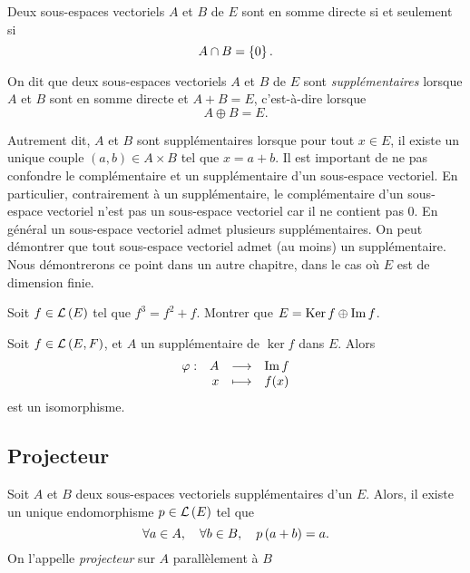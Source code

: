 \documentclass{magnoliaold}
\begin{document}
\begin{proposition}[utile=3]
Deux sous-espaces vectoriels $A$ et $B$ de $E$ sont en somme directe si
et seulement si
\[A\cap B=\left\{0\right\}.\]
\end{proposition}

\begin{definition}[utile=-3]
On dit que deux sous-espaces vectoriels $A$ et $B$ de $E$ sont \emph{supplémentaires}
lorsque $A$ et $B$ sont en somme directe et $A+B=E$, c'est-à-dire lorsque
\[A\oplus B=E.\]
\end{definition}

\begin{remarques}
\remarque Autrement dit, $A$ et $B$ sont supplémentaires lorsque pour tout $x\in E$, il existe un unique couple
  $(a,b)\in A\times B$ tel que $x=a+b$.
\remarque Il est important de ne pas confondre \og le complémentaire \fg et \og un supplémentaire \fg d'un
  sous-espace vectoriel. En particulier, contrairement à un supplémentaire, le complémentaire d'un sous-espace
  vectoriel n'est pas un sous-espace vectoriel car il ne contient pas 0. 
\remarque En général un sous-espace vectoriel admet plusieurs supplémentaires.
\remarque On peut démontrer que tout sous-espace vectoriel admet (au moins) un supplémentaire. 
  Nous démontrerons ce point dans un autre chapitre, dans le cas où $E$ est de dimension finie.
\end{remarques}


\begin{exoUnique}
\exo Soit $f\in\mathcal{L}\left(E\right)$ tel que $f^3=f^2+f$. Montrer que
  $E=\mathop{\rm Ker} f\oplus\operatorname{Im} f$.
\end{exoUnique}

\begin{proposition}[nom={Version géométrique du théorème du rang}]
Soit $f\in\mathcal{L}\left(E,F\right)$, et $A$ un supplémentaire de $\ker f$ dans $E$. Alors
\[\begin{array}[t]{lrcl} \displaystyle{\varphi} : & \displaystyle{A} & \longrightarrow & \displaystyle{\operatorname{Im}f} \\ & \displaystyle{x} & \longmapsto & \displaystyle{f(x)} \end{array}\]
est un isomorphisme.
\end{proposition}

\subsection{Projecteur}

\begin{definition}[utile=-3]
Soit $A$ et $B$ deux sous-espaces vectoriels supplémentaires d'un \Kev $E$.
Alors, il existe un unique endomorphisme $p\in\mathcal{L}\left(E\right)$ tel que
\[\forall a\in A ,\quad \forall b\in B ,\quad p\left(a+b\right)=a.\]
On l'appelle \emph{projecteur} sur $A$ parallèlement à $B$
\end{definition}
\end{document}

